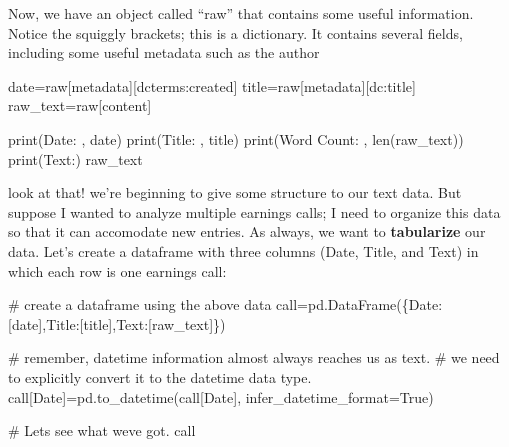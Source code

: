 \documentclass[
  letterpaper,
  DIV=11,
  numbers=noendperiod]{scrreprt}
\newenvironment{Shaded}{\begin{snugshade}}{\end{snugshade}}
\newcommand{\BuiltInTok}[1]{\textcolor[rgb]{0.00,0.23,0.31}{#1}}
\newcommand{\CommentTok}[1]{\textcolor[rgb]{0.37,0.37,0.37}{#1}}
\newcommand{\NormalTok}[1]{\textcolor[rgb]{0.00,0.23,0.31}{#1}}
\newcommand{\OperatorTok}[1]{\textcolor[rgb]{0.37,0.37,0.37}{#1}}
\newcommand{\StringTok}[1]{\textcolor[rgb]{0.13,0.47,0.30}{#1}}
\newcommand{\VariableTok}[1]{\textcolor[rgb]{0.07,0.07,0.07}{#1}}
\begin{document}
Now, we have an object called ``raw'' that contains some useful
information. Notice the squiggly brackets; this is a dictionary. It
contains several fields, including some useful metadata such as the
author

\begin{Shaded}
\begin{Highlighting}[]
\NormalTok{date}\OperatorTok{=}\NormalTok{raw[}\StringTok{\textquotesingle{}metadata\textquotesingle{}}\NormalTok{][}\StringTok{\textquotesingle{}dcterms:created\textquotesingle{}}\NormalTok{]}
\NormalTok{title}\OperatorTok{=}\NormalTok{raw[}\StringTok{\textquotesingle{}metadata\textquotesingle{}}\NormalTok{][}\StringTok{\textquotesingle{}dc:title\textquotesingle{}}\NormalTok{]}
\NormalTok{raw\_text}\OperatorTok{=}\NormalTok{raw[}\StringTok{\textquotesingle{}content\textquotesingle{}}\NormalTok{]}

\BuiltInTok{print}\NormalTok{(}\StringTok{\textquotesingle{}Date: \textquotesingle{}}\NormalTok{, date)}
\BuiltInTok{print}\NormalTok{(}\StringTok{\textquotesingle{}Title: \textquotesingle{}}\NormalTok{, title)}
\BuiltInTok{print}\NormalTok{(}\StringTok{\textquotesingle{}Word Count: \textquotesingle{}}\NormalTok{, }\BuiltInTok{len}\NormalTok{(raw\_text))}
\BuiltInTok{print}\NormalTok{(}\StringTok{\textquotesingle{}Text:\textquotesingle{}}\NormalTok{)}
\NormalTok{raw\_text}
\end{Highlighting}
\end{Shaded}

look at that! we're beginning to give some structure to our text data.
But suppose I wanted to analyze multiple earnings calls; I need to
organize this data so that it can accomodate new entries. As always, we
want to \textbf{tabularize} our data. Let's create a dataframe with
three columns (Date, Title, and Text) in which each row is one earnings
call:

\begin{Shaded}
\begin{Highlighting}[]
\CommentTok{\# create a dataframe using the above data }
\NormalTok{call}\OperatorTok{=}\NormalTok{pd.DataFrame(\{}\StringTok{\textquotesingle{}Date\textquotesingle{}}\NormalTok{:[date],}\StringTok{\textquotesingle{}Title\textquotesingle{}}\NormalTok{:[title],}\StringTok{\textquotesingle{}Text\textquotesingle{}}\NormalTok{:[raw\_text]\})}

\CommentTok{\# remember, datetime information almost always reaches us as text. }
\CommentTok{\# we need to explicitly convert it to the datetime data type. }
\NormalTok{call[}\StringTok{\textquotesingle{}Date\textquotesingle{}}\NormalTok{]}\OperatorTok{=}\NormalTok{pd.to\_datetime(call[}\StringTok{\textquotesingle{}Date\textquotesingle{}}\NormalTok{], infer\_datetime\_format}\OperatorTok{=}\VariableTok{True}\NormalTok{)}

\CommentTok{\# Let\textquotesingle{}s see what we\textquotesingle{}ve got.}
\NormalTok{call}
\end{Highlighting}
\end{Shaded}
\end{document}
